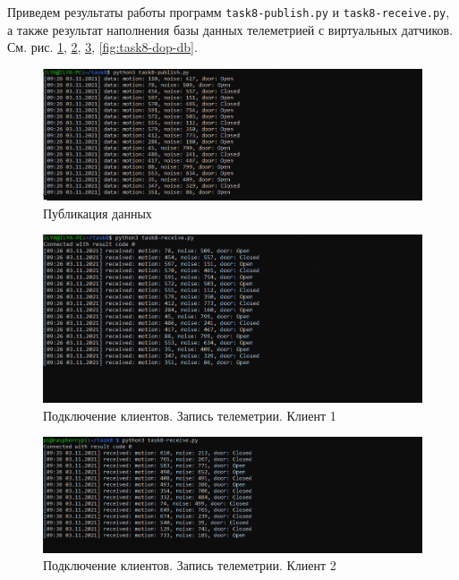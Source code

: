 \documentclass[a4paper,14pt]{extarticle}
\begin{document}
\begin{problem}
	Приведем результаты работы программ \texttt{task8-publish.py} и \texttt{task8-receive.py}, а также результат наполнения базы данных телеметрией с виртуальных датчиков. См. рис. \ref{fig:task8-dop-publish}, \ref{fig:task8-dop-receive}, \ref{fig:task8-dop-receive-2}, \ref{fig:task8-dop-db}.	
	\newpage
	\begin{figure}[htpb]
		\centering
		\includegraphics[width=0.8\linewidth]{images/task8-dop-publish}
		\caption{Публикация данных}
		\label{fig:task8-dop-publish}
	\end{figure}

\begin{figure}[htpb]
	\centering
	\includegraphics[width=0.8\linewidth]{images/task8-dop-receive}
	\caption{Подключение клиентов. Запись телеметрии. Клиент 1}
	\label{fig:task8-dop-receive}
\end{figure}


\begin{figure}[htpb]
	\centering
	\includegraphics[width=0.8\linewidth]{images/task8-dop-receive-2nd-device}
	\caption{Подключение клиентов. Запись телеметрии. Клиент 2}
	\label{fig:task8-dop-receive-2}
\end{figure}



\end{problem}
\end{document}
